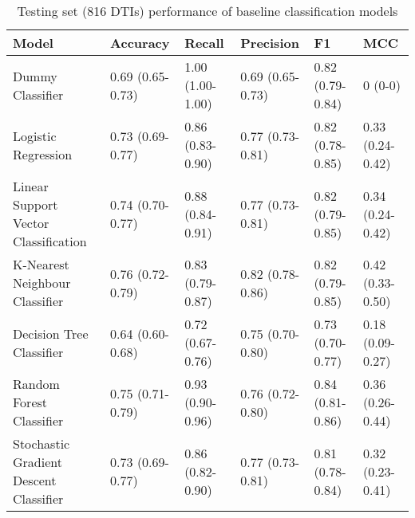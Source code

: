 \begin{table*}
    \tabcolsep=0.08cm
    \begin{tabular}{llllll}
    \toprule
                                     Model &        Accuracy  &           Recall &        Precision &               F1 &              MCC \\
    \midrule
                          Dummy Classifier & 0.69 (0.65-0.73) & 1.00 (1.00-1.00) & 0.69 (0.65-0.73) & 0.82 (0.79-0.84) &          0 (0-0) \\
                       Logistic Regression & 0.73 (0.69-0.77) & 0.86 (0.83-0.90) & 0.77 (0.73-0.81) & 0.82 (0.78-0.85) & 0.33 (0.24-0.42) \\
      Linear Support Vector Classification & 0.74 (0.70-0.77) & 0.88 (0.84-0.91) & 0.77 (0.73-0.81) & 0.82 (0.79-0.85) & 0.34 (0.24-0.42) \\
            K-Nearest Neighbour Classifier & 0.76 (0.72-0.79) & 0.83 (0.79-0.87) & 0.82 (0.78-0.86) & 0.82 (0.79-0.85) & 0.42 (0.33-0.50) \\
                  Decision Tree Classifier & 0.64 (0.60-0.68) & 0.72 (0.67-0.76) & 0.75 (0.70-0.80) & 0.73 (0.70-0.77) & 0.18 (0.09-0.27) \\
                  Random Forest Classifier & 0.75 (0.71-0.79) & 0.93 (0.90-0.96) & 0.76 (0.72-0.80) & 0.84 (0.81-0.86) & 0.36 (0.26-0.44) \\
    Stochastic Gradient Descent Classifier & 0.73 (0.69-0.77) & 0.86 (0.82-0.90) & 0.77 (0.73-0.81) & 0.81 (0.78-0.84) & 0.32 (0.23-0.41) \\
    \bottomrule
    \end{tabular}
    \caption{Testing set (816 DTIs) performance of baseline classification models}
    \label{tbl:baseline_classification}
\end{table*}


